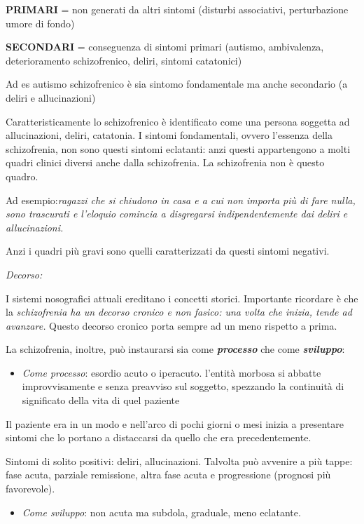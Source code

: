 \textbf{PRIMARI} = non generati da altri sintomi (disturbi associativi,
perturbazione umore di fondo)

\textbf{SECONDARI} = conseguenza di sintomi primari (autismo,
ambivalenza, deterioramento schizofrenico, deliri, sintomi catatonici)

Ad es autismo schizofrenico è sia sintomo fondamentale ma anche
secondario (a deliri e allucinazioni)

Caratteristicamente lo schizofrenico è identificato come una persona
soggetta ad allucinazioni, deliri, catatonia. I sintomi fondamentali,
ovvero l'essenza della schizofrenia, non sono questi sintomi eclatanti:
anzi questi appartengono a molti quadri clinici diversi anche dalla
schizofrenia. La schizofrenia non è questo quadro.

Ad esempio:\emph{ragazzi che si chiudono in casa e a cui non importa più
di fare nulla, sono trascurati e l'eloquio comincia a disgregarsi
indipendentemente dai deliri e allucinazioni.}

Anzi i quadri più gravi sono quelli caratterizzati da questi sintomi
negativi.

\emph{\emph{Decorso:}}

I sistemi nosografici attuali ereditano i concetti storici. Importante
ricordare è che la \emph{schizofrenia ha un decorso cronico e non
fasico: una volta che inizia, tende ad avanzare.} Questo decorso cronico
porta sempre ad un meno rispetto a prima.

La schizofrenia, inoltre, può instaurarsi sia come
\textbf{\emph{processo}} che come \textbf{\emph{sviluppo}}:

\begin{itemize}
\item
  \emph{Come processo}: esordio acuto o iperacuto. l'entità morbosa si
  abbatte improvvisamente e senza preavviso sul soggetto, spezzando la
  continuità di significato della vita di quel paziente
\end{itemize}

Il paziente era in un modo e nell'arco di pochi giorni o mesi inizia a
presentare sintomi che lo portano a distaccarsi da quello che era
precedentemente.

Sintomi di solito positivi: deliri, allucinazioni. Talvolta può avvenire
a più tappe: fase acuta, parziale remissione, altra fase acuta e
progressione (prognosi più favorevole).

\begin{itemize}
\item
  \emph{Come sviluppo}: non acuta ma subdola, graduale, meno eclatante.
\end{itemize}

